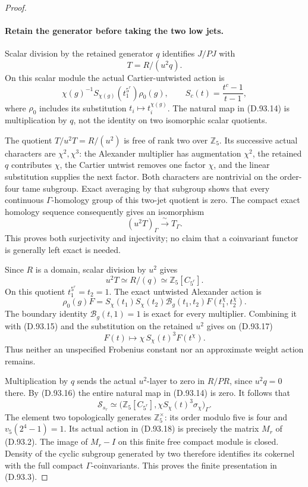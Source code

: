 \begin{proof}
\paragraph{Retain the generator before taking the two low jets.}
Scalar division by the retained generator \(q\) identifies
\(J/PJ\) with
\[
                         T=R/(u^2q).
\]
On this scalar module the actual Cartier-untwisted action is
\[
        \chi(g)^{-1}S_{\chi(g)}(t_1^{5^r})\rho_0(g),
          \qquad S_c(t)=\frac{t^c-1}{t-1},             \tag{D.93.15}
\]
where \(\rho_0\) includes its substitution \(t_i\mapsto
t_i^{\chi(g)}\). The natural map in (D.93.14) is multiplication
by \(q\), not the identity on two isomorphic scalar quotients.

The quotient \(T/u^2T=R/(u^2)\) is free of rank two over
\(\mathbb Z_5\). Its successive actual characters are
\(\chi^2,\chi^3\): the Alexander multiplier has augmentation
\(\chi^2\), the retained \(q\) contributes \(\chi\), the
Cartier untwist removes one factor \(\chi\), and the linear
substitution supplies the next factor. Both characters are
nontrivial on the order-four tame subgroup. Exact averaging
by that subgroup shows that every continuous
\(\Gamma\)-homology group of this two-jet quotient is zero.
The compact exact homology sequence consequently gives an
isomorphism
\[
                 (u^2T)_\Gamma\xrightarrow{\ \sim\ }T_\Gamma.
                                                               \tag{D.93.16}
\]
This proves both surjectivity and injectivity; no claim that a
coinvariant functor is generally left exact is needed.

Since \(R\) is a domain, scalar division by \(u^2\) gives
\[
                u^2T\simeq R/(q)
                    \simeq\mathbb Z_5[C_{5^r}].        \tag{D.93.17}
\]
On this quotient \(t_1^{5^r}=t_2=1\).
The exact untwisted Alexander action is
\[
 \rho_0(g)F=
 S_\chi(t_1)S_\chi(t_2)\mathcal B_g(t_1,t_2)
                 F(t_1^\chi,t_2^\chi).
\]
The boundary identity \(\mathcal B_g(t,1)=1\) is exact for
every multiplier. Combining it with (D.93.15) and the
substitution on the retained \(u^2\) gives on (D.93.17)
\[
                       F(t)\longmapsto
                  \chi\,S_\chi(t)^3 F(t^\chi).         \tag{D.93.18}
\]
Thus neither an unspecified Frobenius constant nor an
approximate weight action remains.

Multiplication by \(q\) sends the actual \(u^2\)-layer to
zero in \(R/PR\), since \(u^2q=0\) there. By (D.93.16)
the entire natural map in (D.93.14) is zero.
It follows that
\[
             \mathcal S_{s_r}\simeq
       \bigl(\mathbb Z_5[C_{5^r}],
                  \chi S_\chi(t)^3\sigma_\chi\bigr)_\Gamma .
                                                               \tag{D.93.19}
\]
The element two topologically generates \(\mathbb Z_5^\times\):
its order modulo five is four and
\(v_5(2^4-1)=1\). Its actual action in (D.93.18) is precisely
the matrix \(M_r\) of (D.93.2). The image of \(M_r-I\)
on this finite free compact module is closed. Density of the
cyclic subgroup generated by two therefore identifies its
cokernel with the full compact \(\Gamma\)-coinvariants.
This proves the finite presentation in (D.93.3).


\end{proof}
